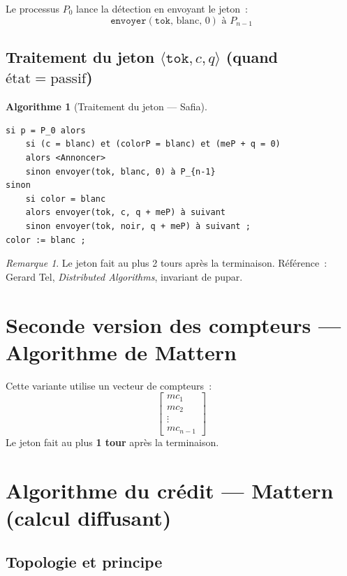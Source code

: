 \documentclass[12pt,a4paper]{article}
\theoremstyle{definition}
\newtheorem{algorithme}{Algorithme}[section]
\theoremstyle{plain}
\theoremstyle{remark}
\newtheorem{remarque}{Remarque}[section]
\newcommand{\tok}{\texttt{tok}}
\begin{document}
Le processus $P_0$ lance la détection en envoyant le jeton~:
\[
  \texttt{envoyer}(\tok,\,\text{blanc},\,0) \text{ à } P_{n-1}
\]

\subsection{Traitement du jeton $\langle \tok, c, q \rangle$ (quand $\mathrm{état} = \text{passif}$)}

\begin{algorithme}[Traitement du jeton — Safia]
\begin{verbatim}
si p = P_0 alors
    si (c = blanc) et (colorP = blanc) et (meP + q = 0)
    alors <Annoncer>
    sinon envoyer(tok, blanc, 0) à P_{n-1}
sinon
    si color = blanc
    alors envoyer(tok, c, q + meP) à suivant
    sinon envoyer(tok, noir, q + meP) à suivant ;
color := blanc ;
\end{verbatim}
\end{algorithme}

\begin{remarque}
Le jeton fait au plus 2 tours après la terminaison.
Référence~: Gerard Tel, \emph{Distributed Algorithms}, invariant de pupar.
\end{remarque}

\section{Seconde version des compteurs — Algorithme de Mattern}

Cette variante utilise un vecteur de compteurs~:
\[
  \begin{bmatrix} mc_1 \\ mc_2 \\ \vdots \\ mc_{n-1} \end{bmatrix}
\]
Le jeton fait au plus \textbf{1 tour} après la terminaison.

\section{Algorithme du crédit — Mattern (calcul diffusant)}

\subsection{Topologie et principe}
\end{document}
